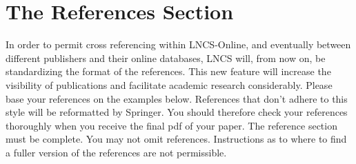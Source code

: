 \documentclass[runningheads,a4paper]{llncs}
\begin{document}









\section{The References Section}\label{references}

In order to permit cross referencing within LNCS-Online, and eventually
between different publishers and their online databases, LNCS will,
from now on, be standardizing the format of the references. This new
feature will increase the visibility of publications and facilitate
academic research considerably. Please base your references on the
examples below. References that don't adhere to this style will be
reformatted by Springer. You should therefore check your references
thoroughly when you receive the final pdf of your paper.
The reference section must be complete. You may not omit references.
Instructions as to where to find a fuller version of the references are
not permissible.
\end{document}
